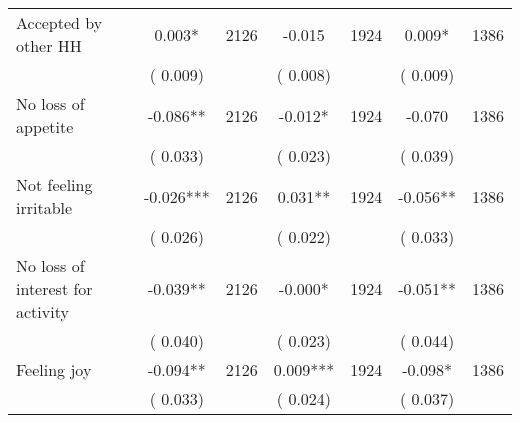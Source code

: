 \begin{tabular}{l*{6}{c}}
Accepted by other HH        &              0.003*      &       2126       &             -0.015      &       1924       &              0.009*      &       1386       \\
                       &       (       0.009)            &                               &       (       0.008)            &                               &       (       0.009)            &                               \\
No loss of appetite        &             -0.086**      &       2126       &             -0.012*      &       1924       &             -0.070      &       1386       \\
                       &       (       0.033)            &                               &       (       0.023)            &                               &       (       0.039)            &                               \\
Not feeling irritable        &             -0.026***      &       2126       &              0.031**      &       1924       &             -0.056**      &       1386       \\
                       &       (       0.026)            &                               &       (       0.022)            &                               &       (       0.033)            &                               \\
No loss of interest for activity        &             -0.039**      &       2126       &             -0.000*      &       1924       &             -0.051**      &       1386       \\
                       &       (       0.040)            &                               &       (       0.023)            &                               &       (       0.044)            &                               \\
Feeling joy        &             -0.094**      &       2126       &              0.009***      &       1924       &             -0.098*      &       1386       \\
                       &       (       0.033)            &                               &       (       0.024)            &                               &       (       0.037)            &                               \\
\hline \end{tabular}